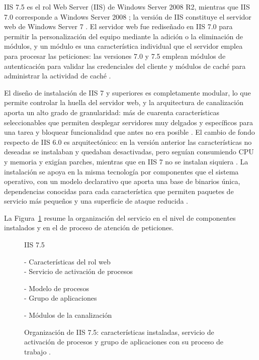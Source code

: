 \documentclass[12pt]{article}
\begin{document}
IIS 7.5 es el rol Web Server (IIS) de Windows Server 2008 R2, mientras que IIS 7.0 corresponde a Windows Server 2008 \parencite{microsoftUnderstandingIisSetup}; la versión de IIS constituye el servidor web de Windows Server 7 \parencite{microsoftRoleWebServerIIS}. El servidor web fue rediseñado en IIS 7.0 para permitir la personalización del equipo mediante la adición o la eliminación de módulos, y un módulo es una característica individual que el servidor emplea para procesar las peticiones: las versiones 7.0 y 7.5 emplean módulos de autenticación para validar las credenciales del cliente y módulos de caché para administrar la actividad de caché \parencite{microsoftInstallIis7}.

El diseño de instalación de IIS 7 y superiores es completamente modular, lo que permite controlar la huella del servidor web, y la arquitectura de canalización aporta un alto grado de granularidad: más de cuarenta características seleccionables que permiten desplegar servidores muy delgados y específicos para una tarea y bloquear funcionalidad que antes no era posible \parencite{microsoftUnderstandingIisSetup}. El cambio de fondo respecto de IIS 6.0 es arquitectónico: en la versión anterior las características no deseadas se instalaban y quedaban desactivadas, pero seguían consumiendo CPU y memoria y exigían parches, mientras que en IIS 7 no se instalan siquiera \parencite{microsoftUnderstandingIisSetup}. La instalación se apoya en la misma tecnología por componentes que el sistema operativo, con un modelo declarativo que aporta una base de binarios única, dependencias conocidas para cada característica que permiten paquetes de servicio más pequeños y una superficie de ataque reducida \parencite{microsoftUnderstandingIisSetup}.

La Figura~\ref{fig:arquitecturaIis75} resume la organización del servicio en el nivel de componentes instalados y en el de proceso de atención de peticiones.

\begin{figure}[htbp]
\centering
\begin{minipage}{0.95\textwidth}
\begin{localsubgroup}
IIS 7.5
\begin{localsubgroup}
- Características del rol web \\
- Servicio de activación de procesos \\
\begin{localsubgroup}
- Modelo de procesos \\
- Grupo de aplicaciones
\end{localsubgroup}
- Módulos de la canalización
\end{localsubgroup}
\end{localsubgroup}
\end{minipage}
\caption{Organización de IIS 7.5: características instaladas, servicio de activación de procesos y grupo de aplicaciones con su proceso de trabajo \parencite{microsoftUnderstandingIisSetup}.}
\label{fig:arquitecturaIis75}
\end{figure}
\end{document}
